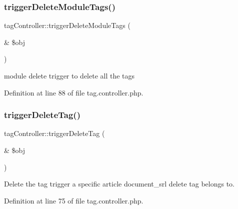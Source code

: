 \mbox{\label{classtagController_a923a01c674ed2ad08b6e25e88f1001cf}} 
\subsubsection{\texorpdfstring{trigger\+Delete\+Module\+Tags()}{triggerDeleteModuleTags()}}
{\footnotesize\ttfamily tag\+Controller\+::trigger\+Delete\+Module\+Tags (\begin{DoxyParamCaption}\item[{\&}]{\$obj }\end{DoxyParamCaption})}



module delete trigger to delete all the tags 



Definition at line 88 of file tag.\+controller.\+php.

\mbox{\label{classtagController_a10bdcf92aea9f67d9c827d910e4454c9}} 
\subsubsection{\texorpdfstring{trigger\+Delete\+Tag()}{triggerDeleteTag()}}
{\footnotesize\ttfamily tag\+Controller\+::trigger\+Delete\+Tag (\begin{DoxyParamCaption}\item[{\&}]{\$obj }\end{DoxyParamCaption})}



Delete the tag trigger a specific article document\+\_\+srl delete tag belongs to. 



Definition at line 75 of file tag.\+controller.\+php.

\mbox{\label{classtagController_ae17dc9d2d9f4d1193c4bb76e2296a060}} 

